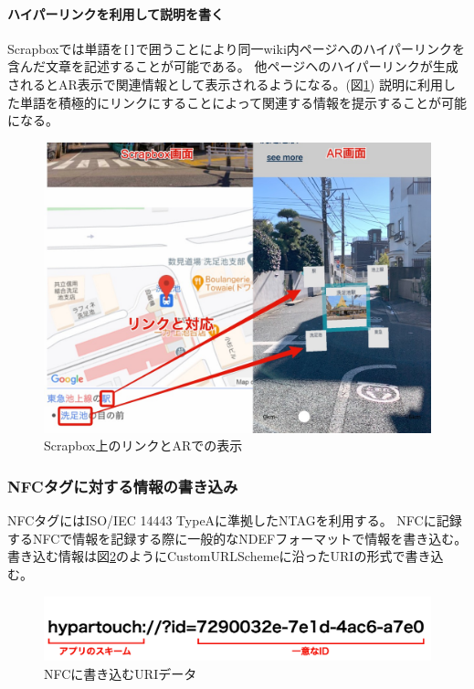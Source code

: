 \paragraph*{ハイパーリンクを利用して説明を書く}
Scrapboxでは単語を\texttt{[]}で囲うことにより同一wiki内ページへのハイパーリンクを含んだ文章を記述することが可能である。
他ページヘのハイパーリンクが生成されるとAR表示で関連情報として表示されるようになる。(図\ref{fig:scrapbox_link_and_ar})
説明に利用した単語を積極的にリンクにすることによって関連する情報を提示することが可能になる。

\begin{figure}[h]
  \centering
  \includegraphics[width=120mm]{images/scrapbox_link_and_ar.jpg}
  \caption{Scrapbox上のリンクとARでの表示} \label{fig:scrapbox_link_and_ar}
\end{figure}

\subsubsection{NFCタグに対する情報の書き込み}
NFCタグにはISO/IEC 14443 TypeAに準拠したNTAGを利用する。
NFCに記録するNFCで情報を記録する際に一般的なNDEFフォーマットで情報を書き込む。
書き込む情報は図\ref{fig:nfc_uri}のようにCustomURLSchemeに沿ったURIの形式で書き込む。

\begin{figure}[h]
  \centering
  \includegraphics[width=120mm]{images/nfc_uri.png}
  \caption{NFCに書き込むURIデータ} \label{fig:nfc_uri}
\end{figure}

